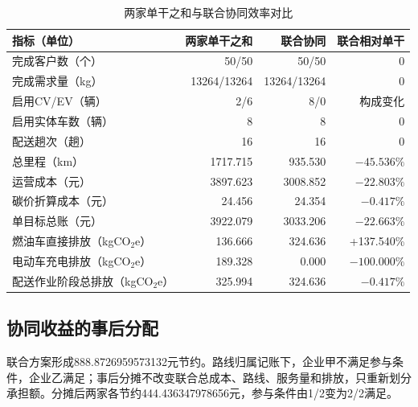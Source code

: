 \documentclass{setp-new}
\begin{document}
\begin{table}[htbp]
  \centering
  \caption{两家单干之和与联合协同效率对比}
  \label{tab:synergy}
  \small
  \begin{tabular}{lrrr}
    \toprule
    指标（单位） & 两家单干之和 & 联合协同 & 联合相对单干\\
    \midrule
    完成客户数（个） & 50/50 & 50/50 & 0\\
    完成需求量（kg） & 13264/13264 & 13264/13264 & 0\\
    启用CV/EV（辆） & 2/6 & 8/0 & 构成变化\\
    启用实体车数（辆） & 8 & 8 & 0\\
    配送趟次（趟） & 16 & 16 & 0\\
    总里程（km） & 1717.715 & 935.530 & $-45.536\%$\\
    运营成本（元） & 3897.623 & 3008.852 & $-22.803\%$\\
    碳价折算成本（元） & 24.456 & 24.354 & $-0.417\%$\\
    单目标总账（元） & 3922.079 & 3033.206 & $-22.663\%$\\
    燃油车直接排放（kgCO$_2$e） & 136.666 & 324.636 & +137.540\%\\
    电动车充电排放（kgCO$_2$e） & 189.328 & 0.000 & $-100.000\%$\\
    配送作业阶段总排放（kgCO$_2$e） & 325.994 & 324.636 & $-0.417\%$\\
    \bottomrule
  \end{tabular}
\end{table}

\subsection{协同收益的事后分配}

联合方案形成888.8726959573132元节约。路线归属记账下，企业甲不满足参与条件，企业乙满足；事后分摊不改变联合总成本、路线、服务量和排放，只重新划分承担额。分摊后两家各节约444.436347978656元，参与条件由1/2变为2/2满足。
\end{document}
